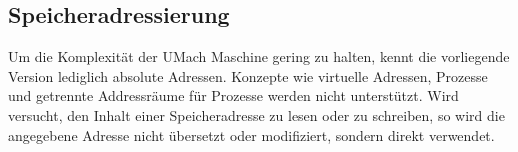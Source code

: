 \subsection{Speicheradressierung}

Um die Komplexität der UMach Maschine gering zu halten, kennt die vorliegende
Version lediglich absolute Adressen. Konzepte wie virtuelle Adressen,
Prozesse und getrennte Addressräume für Prozesse werden nicht
unterstützt. Wird versucht, den Inhalt einer Speicheradresse zu lesen oder zu
schreiben, so wird die angegebene Adresse nicht übersetzt oder modifiziert,
sondern direkt verwendet.


